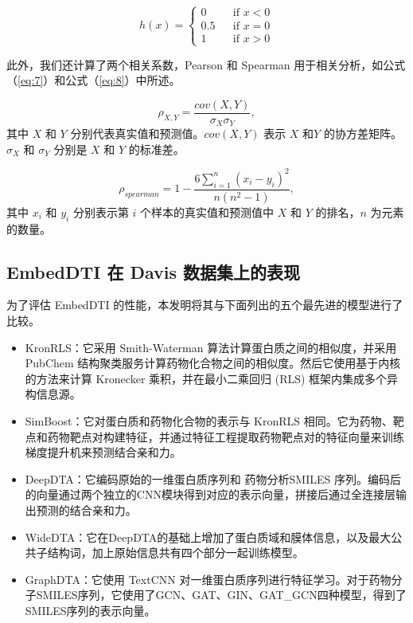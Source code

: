 \begin{equation}
h(x)=\left\{
\begin{aligned}
0  & & \text{if }   x < 0 \\
0.5  & &  \text{if } x = 0 \\
1  &  &\text{if } x > 0
\end{aligned}
\right.
\label{eq:6}
\end{equation}

此外，我们还计算了两个相关系数，Pearson 和 Spearman 用于相关分析，如公式（\ref{eq:7}）和公式（\ref{eq:8}）中所述。

\begin{equation}
  \rho_{X,Y} = \frac{cov(X,Y)}{\sigma_X\sigma_Y},
\label{eq:7}
\end{equation}
其中 $X$ 和 $Y$ 分别代表真实值和预测值。$cov(X,Y)$ 表示 $X$ 和$Y$ 的协方差矩阵。$\sigma_X$ 和 $\sigma_Y$ 分别是 $X$ 和 $Y$ 的标准差。

\begin{equation}
  \rho_{spearman} = 1- \frac{6\sum\limits_{i=1}^{n}(x_i - y_i)^{2}}{n(n^{2} - 1)},
\label{eq:8}
\end{equation}
其中 $x_i$ 和 $y_i$ 分别表示第 $i$ 个样本的真实值和预测值中 $X$ 和 $Y$ 的排名，$n$ 为元素的数量。

\subsection{EmbedDTI 在 Davis 数据集上的表现}
为了评估 EmbedDTI 的性能，本发明将其与下面列出的五个最先进的模型进行了比较。

\begin{itemize}
    \item KronRLS：它采用 Smith-Waterman 算法计算蛋白质之间的相似度，并采用 PubChem 结构聚类服务计算药物化合物之间的相似度。然后它使用基于内核的方法来计算 Kronecker 乘积，并在最小二乘回归 (RLS) 框架内集成多个异构信息源。
    \item SimBoost：它对蛋白质和药物化合物的表示与 KronRLS 相同。它为药物、靶点和药物靶点对构建特征，并通过特征工程提取药物靶点对的特征向量来训练梯度提升机来预测结合亲和力。
    \item DeepDTA：它编码原始的一维蛋白质序列和 药物分析SMILES 序列。编码后的向量通过两个独立的CNN模块得到对应的表示向量，拼接后通过全连接层输出预测的结合亲和力。
    \item WideDTA：它在DeepDTA的基础上增加了蛋白质域和膜体信息，以及最大公共子结构词，加上原始信息共有四个部分一起训练模型。
    \item GraphDTA：它使用 TextCNN 对一维蛋白质序列进行特征学习。对于药物分子SMILES序列，它使用了GCN、GAT、GIN、GAT\_GCN四种模型，得到了SMILES序列的表示向量。
\end{itemize}

